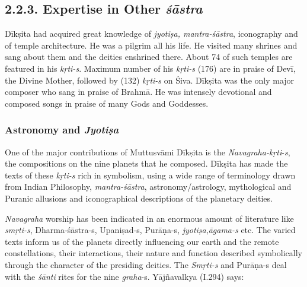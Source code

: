 \vspace{-.3cm}

\subsection*{2.2.3. Expertise in Other \textit{śāstra}}

\vspace{-.2cm}

Dīkṣita had acquired great knowledge of \textit{jyotiṣa, mantra-śāstra}, iconography and of temple architecture. He was a pilgrim all his life. He visited many shrines and sang about them and the deities enshrined there. About 74 of such temples are featured in his \textit{kṛti-s}. Maximum number of his \textit{kṛti-s} (176) are in praise of Devī, the Divine Mother, followed by (132) \textit{kṛti-s} on Śiva. Dīkṣita was the only major composer who sang in praise of Brahmā. He was intensely devotional and composed songs in praise of many Gods and Goddesses.

\vspace{-.3cm}

\subsubsection*{Astronomy and \textit{Jyotiṣa}}

\vspace{-.2cm}

One of the major contributions of Muttusvāmi Dīkṣita is the \textit{Navagraha-kṛti}-\textit{s}, the compositions on the nine planets that he composed. Dīkṣita has made the texts of these \textit{kṛti-s} rich in symbolism, using a wide range of terminology drawn from Indian Philosophy, \textit{mantra-śāstra}, astronomy/astrology, mythological and Puranic allusions and iconographical descriptions of the planetary deities.

\textit{Navagraha} worship has been indicated in an enormous amount of literature like \textit{smṛti-s}, Dharma-śāstra-s, Upaniṣad-s, Purāṇa-s, \textit{jyotiṣa},\break \textit{āgama-s} etc. The varied texts inform us of the planets directly influencing our earth and the remote constellations, their interactions, their nature and function described symbolically through the character of the presiding deities. The \textit{Smṛti-s} and Purāṇa-s deal with the \textit{śānti} rites for the nine \textit{graha}-s. Yājñavalkya (I.294) says:

